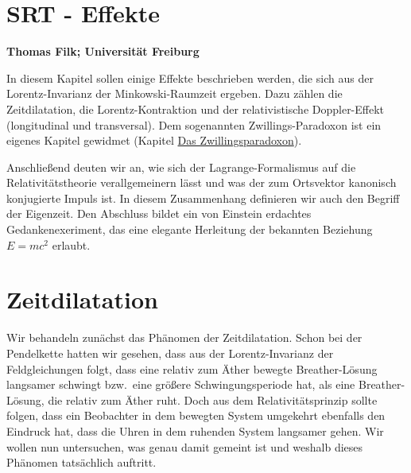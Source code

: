 
\setcounter{page}{1}
\setcounter{section}{0}
\setcounter{figure}{0}
\setcounter{equation}{0}
\setcounter{table}{0}
\setcounter{footnote}{0}

\section*{SRT - Effekte}
\noindent
{\bf Thomas Filk; Universit\"at Freiburg}
\vspace{1cm}

\label{chap_SRT-Effekte}
\noindent
In diesem Kapitel sollen einige Effekte beschrieben werden, die sich
aus der Lorentz-Invarianz der Minkowski-Raumzeit ergeben.
Dazu z\"ahlen die Zeitdilatation, die Lorentz-Kontraktion und der relativistische
Doppler-Effekt (longitudinal und transversal). Dem sogenannten 
Zwillings-Paradoxon ist ein eigenes Kapitel gewidmet (Kapitel \hyperref[chap_Zwilling]{Das Zwillingsparadoxon}).

Anschlie\ss end deuten wir an, wie sich der Lagrange-Formalismus auf die
Relativit\"atstheorie verallgemeinern l\"asst und was der zum Ortsvektor
kanonisch konjugierte Impuls ist. In diesem Zusammenhang definieren wir
auch den Begriff der Eigenzeit. Den Abschluss bildet ein von Einstein
erdachtes Gedankenexeriment, das eine elegante Herleitung der 
bekannten Beziehung $E=mc^2$ erlaubt.

\section{Zeitdilatation}

Wir behandeln zun\"achst das Ph\"anomen
der Zeitdilatation. Schon bei der Pendelkette
hatten wir gesehen, dass aus der Lorentz-Invarianz
der Feldgleichungen folgt, dass eine
relativ zum \"Ather bewegte Breather-L\"osung
langsamer schwingt bzw.\ eine gr\"o\ss ere
Schwingungsperiode hat, als eine Breather-L\"osung, die relativ zum \"Ather ruht.  
Doch aus dem Relativit\"atsprinzip sollte folgen,
dass ein Beobachter in dem bewegten System
umgekehrt ebenfalls den Eindruck hat, dass
die Uhren in dem ruhenden System langsamer
gehen. Wir wollen nun untersuchen, was
genau damit gemeint ist und weshalb dieses
Ph\"anomen tats\"achlich auftritt. 

